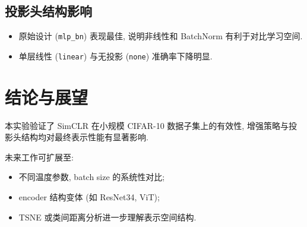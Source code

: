 \documentclass[11pt]{article}
\begin{document}
\subsection{投影头结构影响}
\begin{itemize}
\item 原始设计 (\texttt{mlp\_bn}) 表现最佳, 说明非线性和 BatchNorm 有利于对比学习空间.
\item 单层线性 (\texttt{linear}) 与无投影 (\texttt{none}) 准确率下降明显.
\end{itemize}

\section{\textbf{结论与展望}}
本实验验证了 SimCLR 在小规模 CIFAR-10 数据子集上的有效性, 增强策略与投影头结构均对最终表示性能有显著影响.

未来工作可扩展至:
\begin{itemize}
\item 不同温度参数, batch size 的系统性对比;
\item encoder 结构变体 (如 ResNet34, ViT);
\item TSNE 或类间距离分析进一步理解表示空间结构.
\end{itemize}
\end{document}

